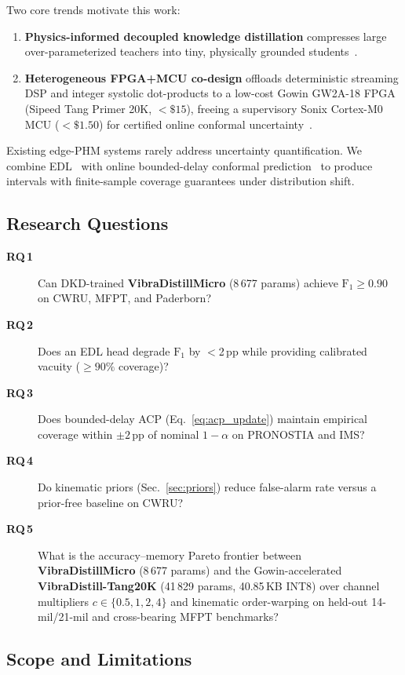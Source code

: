 \documentclass[conference]{IEEEtran}
\newcommand{\VDM}{\textsf{\textbf{VibraDistillMicro}}\xspace}
\newcommand{\RQ}[1]{\textbf{RQ\,#1}}
\begin{document}
Two core trends motivate this work:
\begin{enumerate}
  \item \textbf{Physics-informed decoupled knowledge distillation} compresses
    large over-parameterized teachers into tiny, physically grounded students~\cite{hinton2015distilling,zhao2022decoupled}.
  \item \textbf{Heterogeneous FPGA+MCU co-design} offloads
    deterministic streaming DSP and integer systolic dot-products to a low-cost
    Gowin GW2A-18 FPGA (Sipeed Tang Primer 20K, $<\$15$), freeing a supervisory
    Sonix Cortex-M0 MCU ($<\$1.50$) for certified online conformal uncertainty~\cite{shawahna2019fpga}.
\end{enumerate}

Existing edge-PHM systems rarely address uncertainty quantification.
We combine EDL~\cite{sensoy2018evidential} with online bounded-delay conformal
prediction~\cite{gibbs2021adaptive} to produce intervals with
finite-sample coverage guarantees under distribution shift.

\subsection{Research Questions}
\label{sec:rq}

\begin{description}
  \item[\RQ{1}] Can DKD-trained \VDM{} (8\,677 params) achieve
    $\text{F}_1 \ge 0.90$ on CWRU, MFPT, and Paderborn?
  \item[\RQ{2}] Does an EDL head degrade $\text{F}_1$ by $<$2\,pp
    while providing calibrated vacuity (${\ge}90\%$ coverage)?
  \item[\RQ{3}] Does bounded-delay ACP (Eq.~\ref{eq:acp_update})
    maintain empirical coverage within $\pm 2$\,pp of nominal
    $1{-}\alpha$ on PRONOSTIA and IMS?
  \item[\RQ{4}] Do kinematic priors (Sec.~\ref{sec:priors}) reduce
    false-alarm rate versus a prior-free baseline on CWRU?
  \item[\RQ{5}] What is the accuracy--memory Pareto frontier between \VDM{}
    (8\,677 params) and the Gowin-accelerated \textsf{\textbf{VibraDistill-Tang20K}}
    (41\,829 params, 40.85\,KB INT8) over channel multipliers $c\in\{0.5,1,2,4\}$
    and kinematic order-warping on held-out 14-mil/21-mil and cross-bearing MFPT benchmarks?
\end{description}

\subsection{Scope and Limitations}
\end{document}
